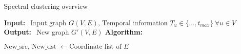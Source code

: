 \documentclass{article}
\begin{document}
\begin{algorithm}
\caption{Spectral clustering overview}
\begin{algorithmic}
\STATE \textbf{Input:}
\STATE   $~~$Input graph $G(V,E)$, Temporal information $T_u \in \{\dots,t_{max}\}\  \forall u\in V $
\STATE \textbf{Output:}
\STATE   $~~$New graph $G'(V,E)$
\STATE \textbf{Algorithm:}
    
\State $\text{New_src, New_dst } \gets \text{Coordinate list of }E$
            \State 
    
\end{algorithmic}
\end{algorithm}
\end{document}
